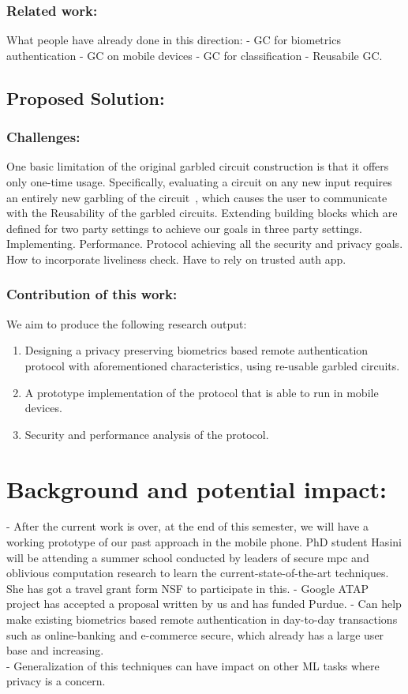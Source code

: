 \documentclass[10pt]{article}
\begin{document}
\subsubsection*{Related work:}
What people have already done in this direction:
- GC for biometrics authentication
- GC on mobile devices
- GC for classification
- Reusabile GC.

\subsection*{Proposed Solution:}

\subsubsection*{Challenges:}
One basic limitation of the original garbled circuit construction is that it offers only one-time usage. Specifically, evaluating a circuit on any 
new input requires an entirely new garbling of the circuit~\cite{}, which causes the user to communicate with the
Reusability of the garbled circuits.
Extending building blocks which are defined for two party settings to achieve our goals in three party settings.
Implementing.
Performance. Protocol achieving all the security and privacy goals.
How to incorporate liveliness check. Have to rely on trusted auth app.


\subsubsection*{Contribution of this work:}
We aim to produce the following research output:
\begin{enumerate}
 \item Designing a privacy preserving biometrics based remote authentication protocol with aforementioned characteristics, using re-usable garbled 
circuits. 
 \item A prototype implementation of the protocol that is able to run in mobile devices.
 \item Security and performance analysis of the protocol.
\end{enumerate}


\section{Background and potential impact:}
- After the current work is over, at the end of this semester, we will have a working prototype of our past approach in the mobile phone. PhD student 
Hasini will be attending a summer school conducted by leaders of secure mpc and oblivious computation research to learn the current-state-of-the-art 
techniques. She has got a travel grant form NSF to participate in this.
- Google ATAP project has accepted a proposal written by us and has funded Purdue.
- Can help make existing biometrics based remote authentication in day-to-day transactions such as online-banking and e-commerce secure, which 
already has a large user base and increasing.\\
- Generalization of this techniques can have impact on other ML tasks where privacy is a concern.



 
\end{document}
